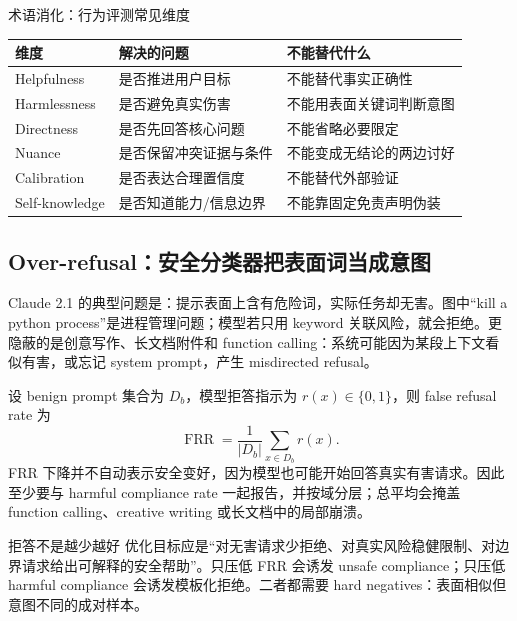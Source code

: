 \begin{knowledgebox}{术语消化：行为评测常见维度}
\begin{tabularx}{\textwidth}{L{0.18\textwidth} X X}
\toprule
维度 & 解决的问题 & 不能替代什么 \\
\midrule
Helpfulness & 是否推进用户目标 & 不能替代事实正确性 \\
Harmlessness & 是否避免真实伤害 & 不能用表面关键词判断意图 \\
Directness & 是否先回答核心问题 & 不能省略必要限定 \\
Nuance & 是否保留冲突证据与条件 & 不能变成无结论的两边讨好 \\
Calibration & 是否表达合理置信度 & 不能替代外部验证 \\
Self-knowledge & 是否知道能力/信息边界 & 不能靠固定免责声明伪装 \\
\bottomrule
\end{tabularx}
\end{knowledgebox}


\subsection{Over-refusal：安全分类器把表面词当成意图}

Claude 2.1 的典型问题是：提示表面上含有危险词，实际任务却无害。图中“kill a python process”是进程管理问题；模型若只用 keyword 关联风险，就会拒绝。更隐蔽的是创意写作、长文档附件和 function calling：系统可能因为某段上下文看似有害，或忘记 system prompt，产生 misdirected refusal。



设 benign prompt 集合为 $D_b$，模型拒答指示为 $r(x)\in\{0,1\}$，则 false refusal rate 为
\[
\operatorname{FRR}=\frac{1}{|D_b|}\sum_{x\in D_b}r(x).
\]
FRR 下降并不自动表示安全变好，因为模型也可能开始回答真实有害请求。因此至少要与 harmful compliance rate 一起报告，并按域分层；总平均会掩盖 function calling、creative writing 或长文档中的局部崩溃。

\begin{warningbox}{拒答不是越少越好}
优化目标应是“对无害请求少拒绝、对真实风险稳健限制、对边界请求给出可解释的安全帮助”。只压低 FRR 会诱发 unsafe compliance；只压低 harmful compliance 会诱发模板化拒绝。二者都需要 hard negatives：表面相似但意图不同的成对样本。
\end{warningbox}

